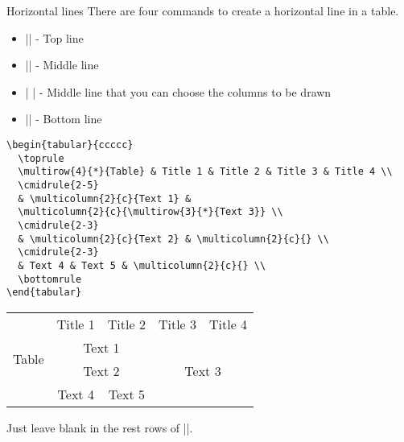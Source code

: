 \begin{frame}[fragile]{Horizontal lines}
  There are four commands to create a horizontal line in a table.

  \begin{itemize}
    \item \LC|\toprule| - Top line
    \item \LC|\midrule| - Middle line
    \item \LC|| - Middle line that you can choose the columns to be drawn
    \item \LC|\bottomrule| - Bottom line
  \end{itemize}
  \pause
  \begin{example}
    \begin{verbatim}
\begin{tabular}{ccccc}
  \toprule
  \multirow{4}{*}{Table} & Title 1 & Title 2 & Title 3 & Title 4 \\
  \cmidrule{2-5}
  & \multicolumn{2}{c}{Text 1} & 
  \multicolumn{2}{c}{\multirow{3}{*}{Text 3}} \\
  \cmidrule{2-3}
  & \multicolumn{2}{c}{Text 2} & \multicolumn{2}{c}{} \\
  \cmidrule{2-3}
  & Text 4 & Text 5 & \multicolumn{2}{c}{} \\
  \bottomrule
\end{tabular}
    \end{verbatim}
  \end{example}
\end{frame}

\begin{frame}[fragile]

\begin{latexexample}
\centering
\begin{tabular}{ccccc}
  \toprule
  \multirow{4}{*}{Table} & Title 1 & Title 2 & Title 3 & Title 4 \\
  \cmidrule{2-5}
  & \multicolumn{2}{c}{Text 1} & 
  \multicolumn{2}{c}{\multirow{3}{*}{Text 3}} \\
  \cmidrule{2-3}
  & \multicolumn{2}{c}{Text 2} & \multicolumn{2}{c}{} \\
  \cmidrule{2-3}
  & Text 4 & Text 5 & \multicolumn{2}{c}{} \\
  \bottomrule
\end{tabular}
\end{latexexample}
\medskip
Just leave blank in the rest rows of \LC|\multirow|.

\end{frame}


